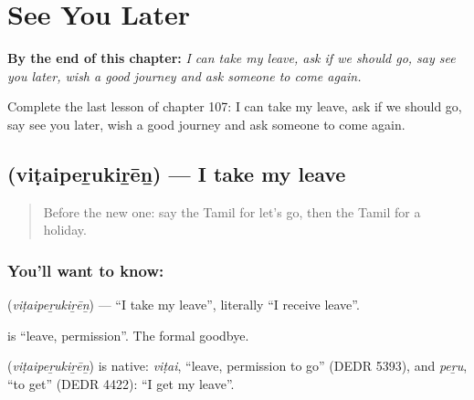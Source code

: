 
\chapter{See You Later}
\label{ch:ta-see-you-later}

\begin{chapteropening}
\textbf{By the end of this chapter:} \emph{I can take my leave, ask if we should go, say see you later, wish a good journey and ask someone to come again.}

Complete the last lesson of chapter 107: I can take my leave, ask if we should go, say see you later, wish a good journey and ask someone to come again.
\end{chapteropening}

\section[\texorpdfstring{\ta{விடைபெறுகிறேன்} (viṭaipeṟukiṟēṉ)}{விடைபெறுகிறேன் (viṭaipeṟukiṟēṉ)}]{ (viṭaipeṟukiṟēṉ) — I take my leave}

\label{lesson:TA-C107-takeleave}



\begin{quote}
Before the new one: say the Tamil for let's go, then the Tamil for a holiday.
\end{quote}

\subsection*{You'll want to know: }
\textbf{} (\emph{viṭaipeṟukiṟēṉ}) — \textquotedblleft{}I take my leave\textquotedblright{}, literally \textquotedblleft{}I receive leave\textquotedblright{}.

\textbf{} is \textquotedblleft{}leave, permission\textquotedblright{}. The formal goodbye.

\begin{cousinweb}
\textbf{} (\emph{viṭaipeṟukiṟēṉ}) is native: \emph{viṭai}, \textquotedblleft{}leave, permission to go\textquotedblright{} (DEDR 5393), and \emph{peṟu}, \textquotedblleft{}to get\textquotedblright{} (DEDR 4422): \textquotedblleft{}I get my leave\textquotedblright{}.
\end{cousinweb}

